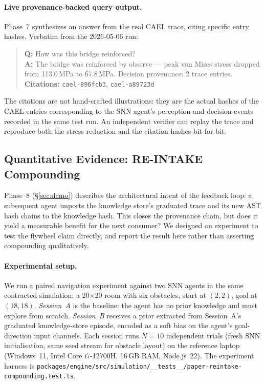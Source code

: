 \documentclass[sigchi-a]{acmart}
\begin{document}
\paragraph{Live provenance-backed query output.}
Phase~7 synthesizes an answer from the real CAEL trace, citing specific
entry hashes. Verbatim from the 2026-05-06 run:
\begin{quote}
\textbf{Q:} How was this bridge reinforced?\\
\textbf{A:} The bridge was reinforced by observe --- peak von Mises stress
dropped from 113.0\,MPa to 67.8\,MPa. Decision provenance: 2 trace entries.\\
\textbf{Citations:} \texttt{cael-896fcb3}, \texttt{cael-a89723d}
\end{quote}
The citations are not hand-crafted illustrations: they are the actual
hashes of the CAEL entries corresponding to the SNN agent's perception
and decision events recorded in the same test run. An independent verifier
can replay the trace and reproduce both the stress reduction and the
citation hashes bit-for-bit.

\subsection{Quantitative Evidence: RE-INTAKE Compounding}
\label{sec:paper-reintake}

Phase~8 (\S\ref{sec:demo}) describes the architectural
intent of the feedback loop: a subsequent agent imports the knowledge
store's graduated trace and its new AST hash chains to the knowledge
hash. This closes the provenance chain, but does it yield a measurable
benefit for the next consumer? We designed an experiment to test the
flywheel claim directly, and report the result here rather than
asserting compounding qualitatively.

\paragraph{Experimental setup.}
We run a paired navigation experiment against two SNN agents in the
same contracted simulation: a 20$\times$20 room with six obstacles,
start at $(2,2)$, goal at $(18,18)$. \emph{Session~A} is the baseline:
the agent has no prior knowledge and must explore from scratch.
\emph{Session~B} receives a prior extracted from Session~A's graduated
knowledge-store episode, encoded as a soft bias on the agent's
goal-direction input channels. Each session runs $N=10$ independent
trials (fresh SNN initialisation, same seed stream for obstacle layout)
on the reference laptop (Windows~11, Intel Core i7-12700H, 16\,GB RAM,
Node.js~22). The experiment harness is
\texttt{packages/engine/src/simulation/\_\_tests\_\_/paper-reintake-compounding.test.ts}.
\end{document}
